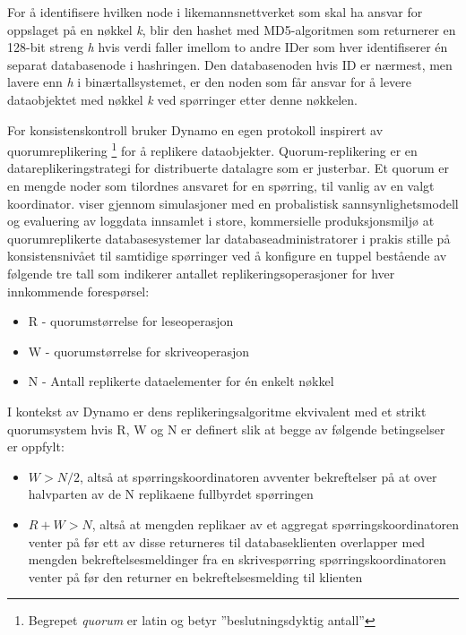 For å identifisere hvilken node i likemannsnettverket som skal ha ansvar for oppslaget på en nøkkel \emph{k}, blir den hashet med MD5-algoritmen som returnerer en 128-bit streng \emph{h} hvis verdi faller imellom to andre IDer som hver identifiserer én separat databasenode i hashringen. Den databasenoden hvis ID er nærmest, men lavere enn \emph{h} i binærtallsystemet, er den noden som får ansvar for å levere dataobjektet med nøkkel \emph{k} ved spørringer etter denne nøkkelen.

For konsistenskontroll bruker Dynamo en egen protokoll inspirert av quorumreplikering \footnote{Begrepet \emph{quorum} er latin og betyr ''beslutningsdyktig antall''} for å replikere dataobjekter. Quorum-replikering er en datareplikeringstrategi for distribuerte datalagre som er justerbar. Et quorum er en mengde noder som tilordnes ansvaret for en spørring, til vanlig av en valgt koordinator. \cite{bailis2014} viser gjennom simulasjoner med en probalistisk sannsynlighetsmodell og evaluering av loggdata innsamlet i store, kommersielle produksjonsmiljø at quorumreplikerte databasesystemer lar databaseadministratorer i prakis stille på konsistensnivået til samtidige spørringer ved å konfigure en tuppel bestående av følgende tre tall som indikerer antallet replikeringsoperasjoner for hver innkommende forespørsel:

\begin{itemize}
  \item R - quorumstørrelse for leseoperasjon
  \item W - quorumstørrelse for skriveoperasjon
  \item N - Antall replikerte dataelementer for én enkelt nøkkel
\end{itemize}

I kontekst av Dynamo er dens replikeringsalgoritme ekvivalent med et strikt quorumsystem hvis R, W og N er definert slik at begge av følgende betingselser er oppfylt:

\begin{itemize}
  \item \(W > N/2\), altså at spørringskoordinatoren avventer bekreftelser på at over halvparten av de N replikaene fullbyrdet spørringen
  \item \(R + W > N\), altså at mengden replikaer av et aggregat spørringskoordinatoren venter på før ett av disse returneres til databaseklienten overlapper med mengden bekreftelsesmeldinger fra en skrivespørring spørringskoordinatoren venter på før den returner en bekreftelsesmelding til klienten
\end{itemize}

